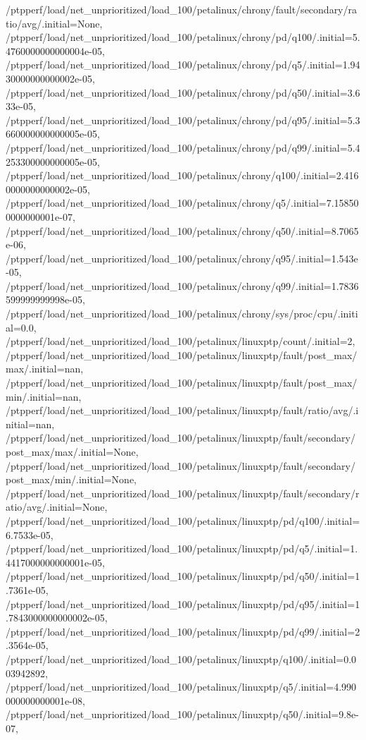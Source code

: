 {    /ptpperf/load/net_unprioritized/load_100/petalinux/chrony/fault/secondary/ratio/avg/.initial=None,
    /ptpperf/load/net_unprioritized/load_100/petalinux/chrony/pd/q100/.initial=5.4760000000000004e-05,
    /ptpperf/load/net_unprioritized/load_100/petalinux/chrony/pd/q5/.initial=1.9430000000000002e-05,
    /ptpperf/load/net_unprioritized/load_100/petalinux/chrony/pd/q50/.initial=3.633e-05,
    /ptpperf/load/net_unprioritized/load_100/petalinux/chrony/pd/q95/.initial=5.3660000000000005e-05,
    /ptpperf/load/net_unprioritized/load_100/petalinux/chrony/pd/q99/.initial=5.4253300000000005e-05,
    /ptpperf/load/net_unprioritized/load_100/petalinux/chrony/q100/.initial=2.4160000000000002e-05,
    /ptpperf/load/net_unprioritized/load_100/petalinux/chrony/q5/.initial=7.158500000000001e-07,
    /ptpperf/load/net_unprioritized/load_100/petalinux/chrony/q50/.initial=8.7065e-06,
    /ptpperf/load/net_unprioritized/load_100/petalinux/chrony/q95/.initial=1.543e-05,
    /ptpperf/load/net_unprioritized/load_100/petalinux/chrony/q99/.initial=1.7836599999999998e-05,
    /ptpperf/load/net_unprioritized/load_100/petalinux/chrony/sys/proc/cpu/.initial=0.0,
    /ptpperf/load/net_unprioritized/load_100/petalinux/linuxptp/count/.initial=2,
    /ptpperf/load/net_unprioritized/load_100/petalinux/linuxptp/fault/post_max/max/.initial=nan,
    /ptpperf/load/net_unprioritized/load_100/petalinux/linuxptp/fault/post_max/min/.initial=nan,
    /ptpperf/load/net_unprioritized/load_100/petalinux/linuxptp/fault/ratio/avg/.initial=nan,
    /ptpperf/load/net_unprioritized/load_100/petalinux/linuxptp/fault/secondary/post_max/max/.initial=None,
    /ptpperf/load/net_unprioritized/load_100/petalinux/linuxptp/fault/secondary/post_max/min/.initial=None,
    /ptpperf/load/net_unprioritized/load_100/petalinux/linuxptp/fault/secondary/ratio/avg/.initial=None,
    /ptpperf/load/net_unprioritized/load_100/petalinux/linuxptp/pd/q100/.initial=6.7533e-05,
    /ptpperf/load/net_unprioritized/load_100/petalinux/linuxptp/pd/q5/.initial=1.4417000000000001e-05,
    /ptpperf/load/net_unprioritized/load_100/petalinux/linuxptp/pd/q50/.initial=1.7361e-05,
    /ptpperf/load/net_unprioritized/load_100/petalinux/linuxptp/pd/q95/.initial=1.7843000000000002e-05,
    /ptpperf/load/net_unprioritized/load_100/petalinux/linuxptp/pd/q99/.initial=2.3564e-05,
    /ptpperf/load/net_unprioritized/load_100/petalinux/linuxptp/q100/.initial=0.003942892,
    /ptpperf/load/net_unprioritized/load_100/petalinux/linuxptp/q5/.initial=4.990000000000001e-08,
    /ptpperf/load/net_unprioritized/load_100/petalinux/linuxptp/q50/.initial=9.8e-07,
}
